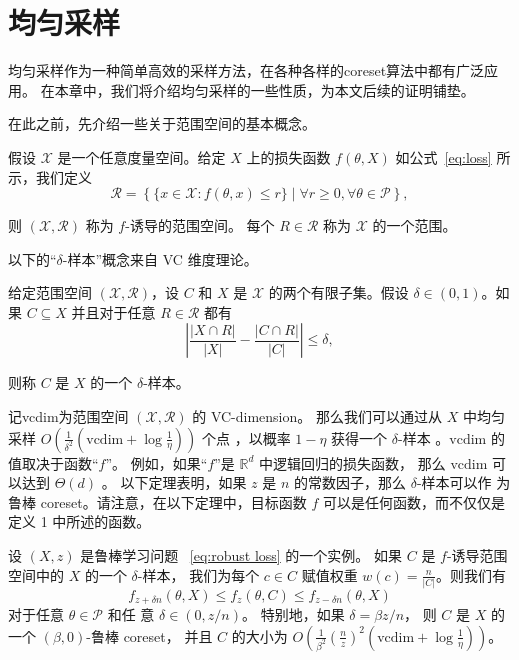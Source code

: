 \chapter{均匀采样}

均匀采样作为一种简单高效的采样方法，在各种各样的coreset算法中都有广泛应用。
在本章中，我们将介绍均匀采样的一些性质，为本文后续的证明铺垫。

在此之前，先介绍一些关于范围空间的基本概念。

\begin{definition}[f-诱导的范围空间]
    假设 $\mathcal{X}$ 是一个任意度量空间。给定 $X$ 上的损失函数 $f(\theta, X)$ 如公式~\eqref{eq:loss} 所示，我们定义
    \begin{equation}
    \mathcal{R} = \left\{ \{ x \in \mathcal{X} : f(\theta, x) \leq r \} \mid \forall r \geq 0, \forall \theta \in \mathcal{P} \right\},
    \end{equation}

则 $(\mathcal{X}, \mathcal{R})$ 称为 $f$-诱导的范围空间。
每个 $R \in \mathcal{R}$ 称为 $\mathcal{X}$ 的一个范围。

\end{definition}

以下的“$\delta$-样本”概念来自 VC 维度理论。

给定范围空间 $(\mathcal{X}, \mathcal{R})$，设 $C$ 和 $X$ 是 $\mathcal{X}$ 的两个有限子集。假设 $\delta \in (0, 1)$。如果 $C \subseteq X$ 并且对于任意 $R \in \mathcal{R}$ 都有
\begin{equation}
\left| \frac{|X \cap R|}{|X|} - \frac{|C \cap R|}{|C|} \right| \leq \delta,
\end{equation}

则称 $C$ 是 $X$ 的一个 $\delta$-样本。

记vcdim为范围空间 $(\mathcal{X}, \mathcal{R})$ 的 VC-dimension。
那么我们可以通过从 $X$ 中均匀采样 $O\left(\frac{1}{\delta^2} \left(\text{vcdim} + \log \frac{1}{\eta}\right)\right)$ 个点
，以概率 $1 - \eta$ 获得一个 $\delta$-样本 \citep{LLS01}。$\text{vcdim}$ 的值取决于函数“$f$”。
例如，如果“$f$”是 $\mathbb{R}^d$ 中逻辑回归的损失函数，
那么 $\text{vcdim}$ 可以达到 $\Theta(d)$ \citep{MSSW18}。
以下定理表明，如果 $z$ 是 $n$ 的常数因子，那么 $\delta$-样本可以作
为鲁棒 coreset。请注意，在以下定理中，目标函数 $f$ 可以是任何函数，而不仅仅是定义 1 中所述的函数。

\begin{theorem}
    设 $(X, z)$ 是鲁棒学习问题 ~\eqref{eq:robust loss} 的一个实例。
    如果 $C$ 是 $f$-诱导范围空间中的 $X$ 的一个 $\delta$-样本，
    我们为每个 $c \in C$ 赋值权重 $w(c) = \frac{n}{|C|}$。则我们有
    \begin{equation*}
    f_{z+\delta n}(\theta, X) \leq f_z(\theta, C) \leq f_{z-\delta n}(\theta, X)
    \end{equation*}
    对于任意 $\theta \in \mathcal{P}$ 和任
    意 $\delta \in (0, z/n)$。
    特别地，如果 $\delta = \beta z / n$，
    则 $C$ 是 $X$ 的一个 $(\beta, 0)$-鲁棒 coreset，
    并且 $C$ 的大小为 $O\left(\frac{1}{\beta^2}\left(\frac{n}{z}\right)^2\left(\text{vcdim} + \log \frac{1}{\eta}\right)\right)$。
\end{theorem}

